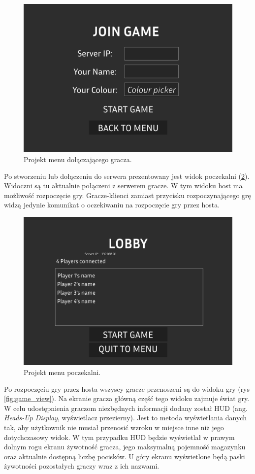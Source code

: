 \begin{figure}
    \centering
    \includegraphics[width=.8\linewidth]{Images/design/Join Menu.png}
    \caption{Projekt menu dołączającego gracza.}
    \label{fig:join_menu}
\end{figure}

Po stworzeniu lub dołączeniu do serwera prezentowany jest widok poczekalni (\ref{fig:lobby_menu}). Widoczni są tu aktualnie połączeni z serwerem gracze. W tym widoku host ma możliwość rozpoczęcie gry. Gracze-klienci zamiast przycisku rozpoczynającego grę widzą jedynie komunikat o oczekiwaniu na rozpoczęcie gry przez hosta.

\begin{figure}
    \centering
    \includegraphics[width=.8\linewidth]{Images/design/Lobby Menu.png}
    \caption{Projekt menu poczekalni.}
    \label{fig:lobby_menu}
\end{figure}

Po rozpoczęciu gry przez hosta wszyscy gracze przenoszeni są do widoku gry (rys \ref{fig:game_view}). Na ekranie gracza główną część tego widoku zajmuje świat gry. W celu udostępnienia graczom niezbędnych informacji dodany został HUD\cite{beyond_hud} (ang. \emph{Heads-Up Display}, wyświetlacz przezierny). Jest to metoda wyświetlania danych tak, aby użytkownik nie musiał przenosić wzroku w miejsce inne niż jego dotychczasowy widok. W tym przypadku HUD będzie wyświetlał w prawym dolnym rogu ekranu żywotność gracza, jego maksymalną pojemność magazynku oraz aktualnie dostępną liczbę pocisków. U góry ekranu wyświetlone będą paski żywotności pozostałych graczy wraz z ich nazwami.


